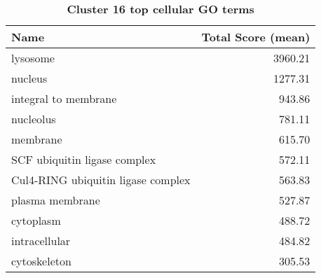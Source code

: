 \begin{table}[h]
\begin{center} \sf
\begin{tabular}{@{}lr@{}}
\toprule
\textbf{Name}                      & \textbf{Total Score (mean)} \\ \midrule
lysosome                           & 3960.21                     \\
nucleus                            & 1277.31                     \\
integral to membrane               & 943.86                      \\
nucleolus                          & 781.11                      \\
membrane                           & 615.70                      \\
SCF ubiquitin ligase complex       & 572.11                      \\
Cul4-RING ubiquitin ligase complex & 563.83                      \\
plasma membrane                    & 527.87                      \\
cytoplasm                          & 488.72                      \\
intracellular                      & 484.82                      \\
cytoskeleton                       & 305.53                      \\ \bottomrule
\end{tabular}
\end{center}

\caption[Cluster 16 top cellular GO terms]{\sf \textbf{Cluster 16 top cellular GO terms}}
\label{tab:cls16-cellular}
\end{table}